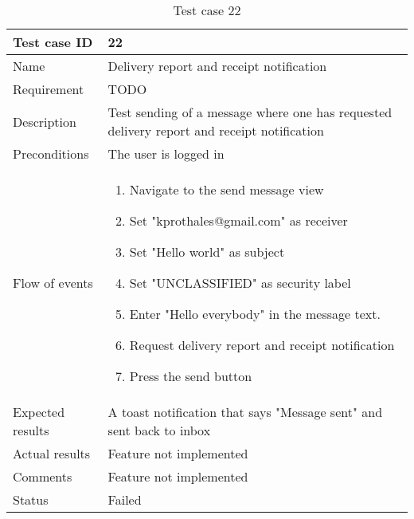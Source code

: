 		\begin{table}
			\begin{tabular}{l|p{10cm}}
				Test case ID & 22 \\ \hline
				Name & Delivery report and receipt notification\\ \hline
				Requirement & TODO\\ \hline
				Description & Test sending of a message where one has requested delivery report and receipt notification\\ \hline
				Preconditions & The user is logged in\\ \hline
				Flow of events & 
					\begin{enumerate}
						\item{}Navigate to the send message view
						\item{}Set "kprothales@gmail.com" as receiver
						\item{}Set "Hello world" as subject
						\item{}Set "UNCLASSIFIED" as security label
						\item{}Enter "Hello everybody" in the message text.
						\item{}Request delivery report and receipt notification
						\item{}Press the send button
					\end{enumerate} \\ \hline
				Expected results & A toast notification that says "Message sent" and sent back to inbox \\ \hline
				Actual results & Feature not implemented\\ \hline
				Comments &Feature not implemented\\ \hline
				Status &Failed \\ \hline
			\end{tabular}
			\caption{Test case 22} \label{tab:case22}
		\end{table}

